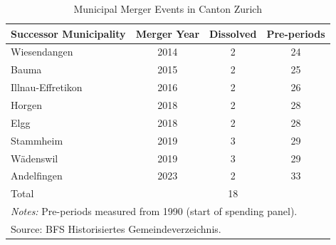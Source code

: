 \begin{table}[htbp]
\centering
\caption{Municipal Merger Events in Canton Zurich}
\label{tab:events}
\begin{tabular}{lccc}
\hline\hline
Successor Municipality & Merger Year & Dissolved & Pre-periods \\
\hline
Wiesendangen & 2014 & 2 & 24 \\
Bauma & 2015 & 2 & 25 \\
Illnau-Effretikon & 2016 & 2 & 26 \\
Horgen & 2018 & 2 & 28 \\
Elgg & 2018 & 2 & 28 \\
Stammheim & 2019 & 3 & 29 \\
Wädenswil & 2019 & 3 & 29 \\
Andelfingen & 2023 & 2 & 33 \\
\hline
Total & & 18 & \\
\hline\hline
\multicolumn{4}{l}{\footnotesize \textit{Notes:} Pre-periods measured from 1990 (start of spending panel).} \\
\multicolumn{4}{l}{\footnotesize Source: BFS Historisiertes Gemeindeverzeichnis.} \\
\end{tabular}
\end{table}
